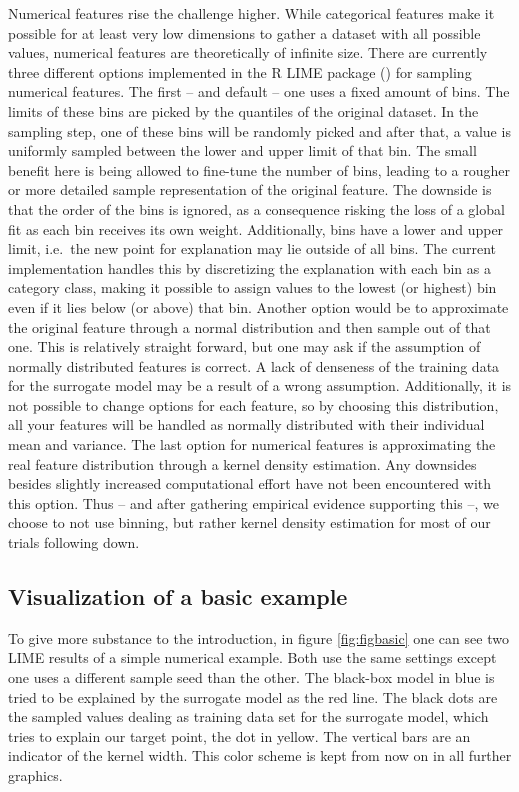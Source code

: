 \documentclass[]{krantz}
\begin{document}
Numerical features rise the challenge higher. While categorical features
make it possible for at least very low dimensions to gather a dataset
with all possible values, numerical features are theoretically of
infinite size. There are currently three different options implemented
in the R LIME package (\citet{thomasp85lime}) for sampling numerical
features. The first -- and default -- one uses a fixed amount of bins.
The limits of these bins are picked by the quantiles of the original
dataset. In the sampling step, one of these bins will be randomly picked
and after that, a value is uniformly sampled between the lower and upper
limit of that bin. The small benefit here is being allowed to fine-tune
the number of bins, leading to a rougher or more detailed sample
representation of the original feature. The downside is that the order
of the bins is ignored, as a consequence risking the loss of a global
fit as each bin receives its own weight. Additionally, bins have a lower
and upper limit, i.e.~the new point for explanation may lie outside of
all bins. The current implementation handles this by discretizing the
explanation with each bin as a category class, making it possible to
assign values to the lowest (or highest) bin even if it lies below (or
above) that bin. Another option would be to approximate the original
feature through a normal distribution and then sample out of that one.
This is relatively straight forward, but one may ask if the assumption
of normally distributed features is correct. A lack of denseness of the
training data for the surrogate model may be a result of a wrong
assumption. Additionally, it is not possible to change options for each
feature, so by choosing this distribution, all your features will be
handled as normally distributed with their individual mean and variance.
The last option for numerical features is approximating the real feature
distribution through a kernel density estimation. Any downsides besides
slightly increased computational effort have not been encountered with
this option. Thus -- and after gathering empirical evidence supporting
this --, we choose to not use binning, but rather kernel density
estimation for most of our trials following down.

\subsection{Visualization of a basic
example}\label{visualization-of-a-basic-example}

To give more substance to the introduction, in figure \ref{fig:figbasic}
one can see two LIME results of a simple numerical example. Both use the
same settings except one uses a different sample seed than the other.
The black-box model in blue is tried to be explained by the surrogate
model as the red line. The black dots are the sampled values dealing as
training data set for the surrogate model, which tries to explain our
target point, the dot in yellow. The vertical bars are an indicator of
the kernel width. This color scheme is kept from now on in all further
graphics.
\end{document}
